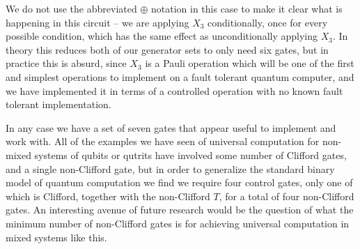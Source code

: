 We do not use the abbreviated $\oplus$ notation in this case to make it clear what is happening in this circuit -- we are applying $X_3$ conditionally, once for every possible condition, which has the same effect as unconditionally applying $X_3$. In theory this reduces both of our generator sets to only need six gates, but in practice this is absurd, since $X_3$ is a Pauli operation which will be one of the first and simplest operations to implement on a fault tolerant quantum computer, and we have implemented it in terms of a controlled operation with no known fault tolerant implementation.

In any case we have a set of seven gates that appear useful to implement and work with. All of the examples we have seen of universal computation for non-mixed systems of qubits or qutrits have involved some number of Clifford gates, and a single non-Clifford gate, but in order to generalize the standard binary model of quantum computation we find we require four control gates, only one of which is Clifford, together with the non-Clifford $T$, for a total of four non-Clifford gates. An interesting avenue of future research would be the question of what the minimum number of non-Clifford gates is for achieving universal computation in mixed systems like this.
